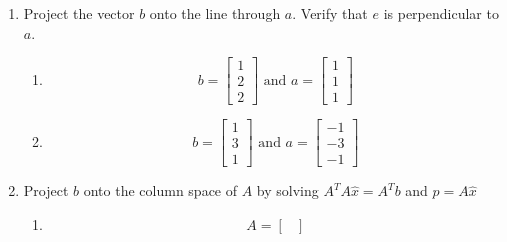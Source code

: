 \begin{enumerate}[label=(\alph*)]
    \item Project the vector $b$ onto the line through $a$. Verify that $e$
        is perpendicular to $a$.
        \begin{enumerate}[label=(\arabic*)]
            \item
                \begin{equation}
                    b =
                    \begin{bmatrix}
                        1       \\
                        2       \\
                        2
                    \end{bmatrix}
                    \text{ and }
                    a = 
                    \begin{bmatrix}
                        1       \\
                        1       \\
                        1
                    \end{bmatrix}
                \end{equation}
            \item
                \begin{equation}
                    b =
                    \begin{bmatrix}
                        1       \\
                        3       \\
                        1
                    \end{bmatrix}
                    \text{ and }
                    a = 
                    \begin{bmatrix}
                        -1      \\
                        -3      \\
                        -1
                    \end{bmatrix}
                \end{equation}
        \end{enumerate}
    \item Project $b$ onto the column space of $A$ by solving
        $A^{T}A\widehat{x}=A^{T}b$ and $p=A\widehat{x}$
        \begin{enumerate}[label=(\arabic*)]
            \item 
                \begin{equation}
                    A = 
                    \begin{bmatrix}

\end{bmatrix}
\end{equation}
\end{enumerate}
\end{enumerate}
